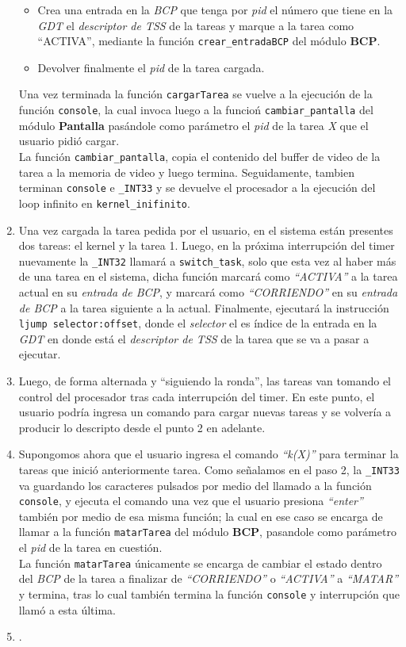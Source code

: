 \documentclass[11pt, a4paper]{article}
\begin{document}
\begin{enumerate}
\begin{itemize}
			\item Crea una entrada en la \textit{BCP} que tenga por \textit{pid} el número que tiene en la \textit{GDT} el \textit{descriptor de TSS} de la tareas y marque a la tarea como ``ACTIVA'', mediante la función \texttt{crear\_entradaBCP} del módulo \textbf{BCP}.
			\item Devolver finalmente el \textit{pid} de la tarea cargada.
		\end{itemize}
		Una vez terminada la función \texttt{cargarTarea} se vuelve a la ejecución de la función \texttt{console}, la cual invoca luego a la funcioń \texttt{cambiar\_pantalla} del módulo \textbf{Pantalla} pasándole como parámetro el \textit{pid} de la tarea \textit{X} que el usuario pidió cargar.\\
		La función \texttt{cambiar\_pantalla}, copia el contenido del buffer de video de la tarea a la memoria de video y luego termina. Seguidamente, tambien terminan \texttt{console} e \texttt{\_INT33} y se devuelve el procesador a la ejecución del loop infinito en \texttt{kernel\_inifinito}.
		\item Una vez cargada la tarea pedida por el usuario, en el sistema están presentes dos tareas: el kernel y la tarea 1. Luego, en la próxima interrupción del timer nuevamente la \texttt{\_INT32} llamará a \texttt{switch\_task}, solo que esta vez al haber más de una tarea en el sistema, dicha función marcará como \textit{``ACTIVA''} a la tarea actual en su \textit{entrada de BCP}, y marcará como \textit{``CORRIENDO''} en su \textit{entrada de BCP} a la tarea siguiente a la actual. Finalmente, ejecutará la instrucción \texttt{ljump selector:offset}, donde el \textit{selector} el es índice de la entrada en la \textit{GDT} en donde está el \textit{descriptor de TSS} de la tarea que se va a pasar a ejecutar.
		\item Luego, de forma alternada y ``siguiendo la ronda'', las tareas van tomando el control del procesador tras cada interrupción del timer. En este punto, el usuario podría ingresa un comando para cargar nuevas tareas y se volvería a producir lo descripto desde el punto 2 en adelante.
		\item  Supongomos ahora que el usuario ingresa el comando \textit{``k(X)''} para terminar la tareas que inició anteriormente tarea. Como señalamos en el paso 2, la \texttt{\_INT33} va guardando los caracteres pulsados por medio del llamado a la función \texttt{console}, y ejecuta el comando una vez que el usuario presiona \textit{``enter''} también por medio de esa misma función; la cual en ese caso se encarga de llamar a la función \texttt{matarTarea} del módulo \textbf{BCP}, pasandole como parámetro el \textit{pid} de la tarea en cuestión.\\
		La función \texttt{matarTarea} únicamente se encarga de cambiar el estado dentro del \textit{BCP} de la tarea a finalizar de \textit{``CORRIENDO''} o \textit{``ACTIVA''} a \textit{``MATAR''} y termina, tras lo cual también termina la función \texttt{console} y interrupción que llamó a esta última.
		\item
.	\end{enumerate}
\end{document}
